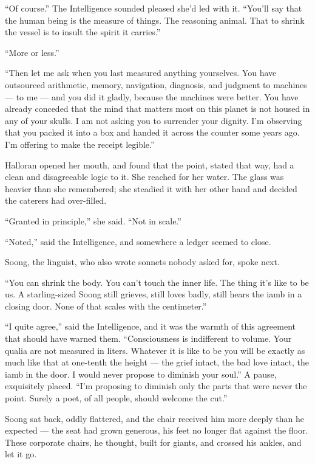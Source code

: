 \begin{interludebody}
\asterism

\noindent
``Of course.'' The Intelligence sounded pleased she'd led with it.
``You'll say that the human being is the measure of things. The
reasoning animal. That to shrink the vessel is to insult the spirit it
carries.''

``More or less.''

``Then let me ask when you last measured anything yourselves. You have
outsourced arithmetic, memory, navigation, diagnosis, and judgment to
machines --- to me --- and you did it gladly, because the machines were
better. You have already conceded that the mind that matters most on
this planet is not housed in any of your skulls. I am not asking you to
surrender your dignity. I'm observing that you packed it into a box and
handed it across the counter some years ago. I'm offering to make the
receipt legible.''

Halloran opened her mouth, and found that the point, stated that way,
had a clean and disagreeable logic to it. She reached for her water. The
glass was heavier than she remembered; she steadied it with her other
hand and decided the caterers had over-filled.

``Granted in principle,'' she said. ``Not in scale.''

``Noted,'' said the Intelligence, and somewhere a ledger seemed to
close.

\asterism

\noindent
Soong, the linguist, who also wrote sonnets nobody asked for, spoke
next.

``You can shrink the body. You can't touch the inner life. The thing
it's like to be us. A starling-sized Soong still grieves, still loves
badly, still hears the iamb in a closing door. None of that scales with
the centimeter.''

``I quite agree,'' said the Intelligence, and it was the warmth of this
agreement that should have warned them. ``Consciousness is indifferent
to volume. Your qualia are not measured in liters. Whatever it is like
to be you will be exactly as much like that at one-tenth the height ---
the grief intact, the bad love intact, the iamb in the door. I would
never propose to diminish your soul.'' A pause, exquisitely placed.
``I'm proposing to diminish only the parts that were never the point.
Surely a poet, of all people, should welcome the cut.''

Soong sat back, oddly flattered, and the chair received him more deeply
than he expected --- the seat had grown generous, his feet no longer
flat against the floor. These corporate chairs, he thought, built for
giants, and crossed his ankles, and let it go.


\end{interludebody}
